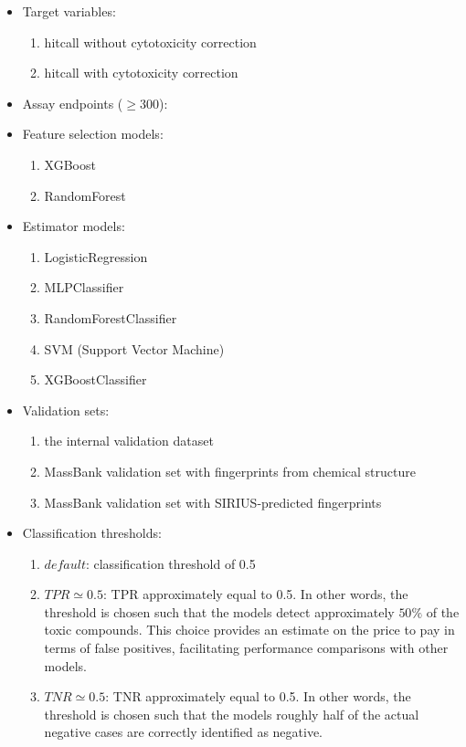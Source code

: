 \begin{itemize}
  \item Target variables:
  \begin{enumerate}
    \item hitcall without cytotoxicity correction
    \item hitcall with cytotoxicity correction
  \end{enumerate}
  \item Assay endpoints ($\geq 300$):
  \item Feature selection models:
    \begin{enumerate}
      \item XGBoost
      \item RandomForest
    \end{enumerate}
    \item Estimator models:
    \begin{enumerate}
      \item LogisticRegression
      \item MLPClassifier
      \item RandomForestClassifier
      \item SVM (Support Vector Machine)
      \item XGBoostClassifier
    \end{enumerate}
  \item Validation sets:
    \begin{enumerate}
      \item the internal validation dataset 
      \item MassBank validation set with fingerprints from chemical structure
      \item MassBank validation set with SIRIUS-predicted fingerprints
    \end{enumerate}
  \item Classification thresholds:
    \begin{enumerate}
      \item $default$: classification threshold of 0.5
      \item $TPR \simeq 0.5$: TPR approximately equal to 0.5. In other words, the threshold is chosen such that the models detect approximately $50\%$ of the toxic compounds. This choice provides an estimate on the price to pay in terms of false positives, facilitating performance comparisons with other models.
      \item $TNR \simeq 0.5$: TNR approximately equal to 0.5. In other words, the threshold is chosen such that the models roughly half of the actual negative cases are correctly identified as negative.

\end{enumerate}
\end{itemize}
